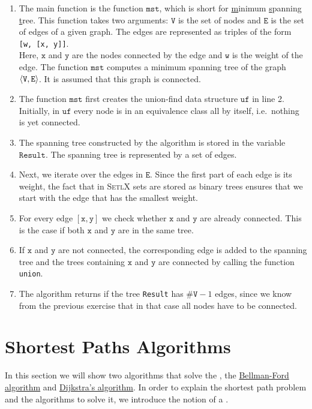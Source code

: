 \begin{enumerate}
\item The main function is the function $\texttt{mst}$, which is short for \underline{m}inimum
      \underline{s}panning \underline{t}ree.  This function takes two arguments:
      $\texttt{V}$ is the set of nodes and $\texttt{E}$ is the set of edges of a given graph.  The edges are represented as
      triples of the form
      \\[0.2cm]
      \hspace*{1.3cm}
      \texttt{[w, [x, y]]}.
      \\[0.2cm] 
      Here, $\texttt{x}$ and $\texttt{y}$ are the nodes connected by the edge and $\texttt{w}$ is the
      weight of the edge.  The function $\texttt{mst}$ computes a minimum spanning tree of  the
      graph  $\pair(\texttt{V},\texttt{E})$.  It is assumed that this graph is connected.
\item The function $\texttt{mst}$ first creates the union-find data structure $\texttt{uf}$ in line 2.
      Initially, in $\texttt{uf}$ every node is in an equivalence class all by itself, i.e.~nothing is
      yet connected.
\item The spanning tree constructed by the algorithm is stored in the variable $\texttt{Result}$.
      The spanning tree is represented by a set of edges.  
\item Next, we iterate over the edges in $\texttt{E}$.  Since the first part of each edge is its
  weight, the fact that in \textsc{SetlX} sets are stored as  binary trees ensures that
      we start with the edge that has the smallest weight.
\item For every edge $[\texttt{x},\texttt{y}]$ we check whether $\texttt{x}$ and $\texttt{y}$ are already
      connected.  This is the case if both $\texttt{x}$ and $\texttt{y}$ are in the same tree.
\item If $\texttt{x}$ and $\texttt{y}$ are not connected, the corresponding edge is added to the
      spanning tree and the trees containing $\texttt{x}$ and $\texttt{y}$ are connected by calling the function
      \texttt{union}.
\item The algorithm returns if the tree \texttt{Result} has $\texttt{\#V}-1$ edges, since we know from the previous
      exercise that in that case all nodes have to be connected.
\end{enumerate}


\section{Shortest Paths Algorithms}
In this section we will show two algorithms that solve the
\href{https://en.wikipedia.org/wiki/Shortest_path_problem}{}, the 
\href{https://en.wikipedia.org/wiki/Bellman-Ford_algorithm}{Bellman-Ford algorithm} and
\href{https://en.wikipedia.org/wiki/Dijkstra%27s_algorithm}{Dijkstra's algorithm}.  
In order to explain the shortest path problem and the algorithms to solve it, we introduce the notion
of a \href{https://en.wikipedia.org/wiki/Directed_graph}{}.


